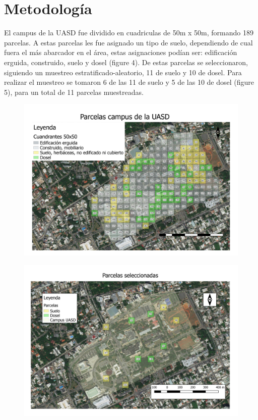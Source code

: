 \documentclass[11pt,]{article}
\begin{document}
\section{Metodología}\label{metodologuxeda}

El campus de la UASD fue dividido en cuadriculas de 50m x 50m, formando
189 parcelas. A estas parcelas les fue asignado un tipo de suelo,
dependiendo de cual fuera el más abarcador en el área, estas
asignaciones podían ser: edificación erguida, construido, suelo y dosel
(figure 4). De estas parcelas se seleccionaron, siguiendo un muestreo
estratificado-aleatorio, 11 de suelo y 10 de dosel. Para realizar el
muestreo se tomaron 6 de las 11 de suelo y 5 de las 10 de dosel (figure
5), para un total de 11 parcelas muestreadas.

\begin{figure}
\centering
\includegraphics{parc uasd.jpeg}
\caption{}
\end{figure}

\begin{figure}
\centering
\includegraphics{parc sel.jpeg}
\caption{}
\end{figure}
\end{document}
